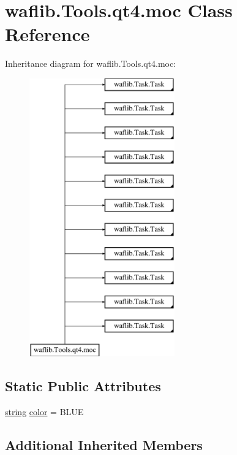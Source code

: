 \hypertarget{classwaflib_1_1_tools_1_1qt4_1_1moc}{}\section{waflib.\+Tools.\+qt4.\+moc Class Reference}
\label{classwaflib_1_1_tools_1_1qt4_1_1moc}
Inheritance diagram for waflib.\+Tools.\+qt4.\+moc\+:\begin{figure}[H]
\begin{center}
\leavevmode
\includegraphics[height=12.000000cm]{classwaflib_1_1_tools_1_1qt4_1_1moc}
\end{center}
\end{figure}
\subsection*{Static Public Attributes}
\begin{DoxyCompactItemize}
\item 
\hyperlink{test__lib_f_l_a_c_2format_8c_ab02026ad0de9fb6c1b4233deb0a00c75}{string} \hyperlink{classwaflib_1_1_tools_1_1qt4_1_1moc_acbefbdd5e0d8dd2208401f965ef35d1b}{color} = \textquotesingle{}B\+L\+UE\textquotesingle{}
\end{DoxyCompactItemize}
\subsection*{Additional Inherited Members}



